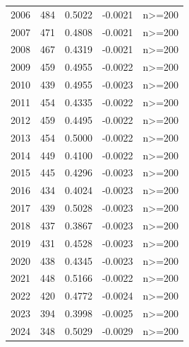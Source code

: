 \begin{tabular}{rrrrl}
2006 & 484 & 0.5022 & -0.0021 & n>=200 \\
2007 & 471 & 0.4808 & -0.0021 & n>=200 \\
2008 & 467 & 0.4319 & -0.0021 & n>=200 \\
2009 & 459 & 0.4955 & -0.0022 & n>=200 \\
2010 & 439 & 0.4955 & -0.0023 & n>=200 \\
2011 & 454 & 0.4335 & -0.0022 & n>=200 \\
2012 & 459 & 0.4495 & -0.0022 & n>=200 \\
2013 & 454 & 0.5000 & -0.0022 & n>=200 \\
2014 & 449 & 0.4100 & -0.0022 & n>=200 \\
2015 & 445 & 0.4296 & -0.0023 & n>=200 \\
2016 & 434 & 0.4024 & -0.0023 & n>=200 \\
2017 & 439 & 0.5028 & -0.0023 & n>=200 \\
2018 & 437 & 0.3867 & -0.0023 & n>=200 \\
2019 & 431 & 0.4528 & -0.0023 & n>=200 \\
2020 & 438 & 0.4345 & -0.0023 & n>=200 \\
2021 & 448 & 0.5166 & -0.0022 & n>=200 \\
2022 & 420 & 0.4772 & -0.0024 & n>=200 \\
2023 & 394 & 0.3998 & -0.0025 & n>=200 \\
2024 & 348 & 0.5029 & -0.0029 & n>=200 \\
\bottomrule
\end{tabular}
